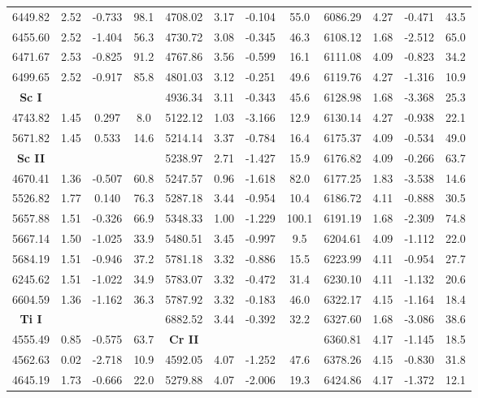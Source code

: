 \documentclass[dvips,12pt,a4paper]{report}
\begin{document}
{{\begin{table}[h]
\begin{tabular}{c c c c | c c c c | c c c c}
6449.82 & 2.52 & -0.733 &  98.1 & 4708.02 & 3.17 & -0.104 &  55.0 & 6086.29 & 4.27 & -0.471 &  43.5 \\
6455.60 & 2.52 & -1.404 &  56.3 & 4730.72 & 3.08 & -0.345 &  46.3 & 6108.12 & 1.68 & -2.512 &  65.0 \\
6471.67 & 2.53 & -0.825 &  91.2 & 4767.86 & 3.56 & -0.599 &  16.1 & 6111.08 & 4.09 & -0.823 &  34.2 \\
6499.65 & 2.52 & -0.917 &  85.8 & 4801.03 & 3.12 & -0.251 &  49.6 & 6119.76 & 4.27 & -1.316 &  10.9 \\
\textbf{Sc I} &  & &  & 4936.34 & 3.11 & -0.343 &  45.6 & 6128.98 & 1.68 & -3.368 &  25.3 \\
4743.82 & 1.45 &  0.297 &   8.0 & 5122.12 & 1.03 & -3.166 &  12.9 & 6130.14 & 4.27 & -0.938 &  22.1 \\
5671.82 & 1.45 &  0.533 &  14.6 & 5214.14 & 3.37 & -0.784 &  16.4 & 6175.37 & 4.09 & -0.534 &  49.0 \\
\textbf{Sc II} &  & & & 5238.97 & 2.71 & -1.427 &  15.9 & 6176.82 & 4.09 & -0.266 &  63.7 \\
4670.41 & 1.36 & -0.507 &  60.8 & 5247.57 & 0.96 & -1.618 &  82.0 & 6177.25 & 1.83 & -3.538 &  14.6 \\
5526.82 & 1.77 &  0.140 &  76.3 & 5287.18 & 3.44 & -0.954 &  10.4 & 6186.72 & 4.11 & -0.888 &  30.5 \\
5657.88 & 1.51 & -0.326 &  66.9 & 5348.33 & 1.00 & -1.229 & 100.1 & 6191.19 & 1.68 & -2.309 &  74.8 \\
5667.14 & 1.50 & -1.025 &  33.9 & 5480.51 & 3.45 & -0.997 &   9.5 & 6204.61 & 4.09 & -1.112 &  22.0 \\
5684.19 & 1.51 & -0.946 &  37.2 & 5781.18 & 3.32 & -0.886 &  15.5 & 6223.99 & 4.11 & -0.954 &  27.7 \\
6245.62 & 1.51 & -1.022 &  34.9 & 5783.07 & 3.32 & -0.472 &  31.4 & 6230.10 & 4.11 & -1.132 &  20.6 \\
6604.59 & 1.36 & -1.162 &  36.3 & 5787.92 & 3.32 & -0.183 &  46.0 & 6322.17 & 4.15 & -1.164 &  18.4 \\
\textbf{Ti I} &  & & & 6882.52 & 3.44 & -0.392 &  32.2 & 6327.60 & 1.68 & -3.086 &  38.6 \\
4555.49 & 0.85 & -0.575 &  63.7 & \textbf{Cr II} & & &  & 6360.81 & 4.17 & -1.145 &  18.5 \\
4562.63 & 0.02 & -2.718 &  10.9 & 4592.05 & 4.07 & -1.252 &  47.6 & 6378.26 & 4.15 & -0.830 &  31.8 \\
4645.19 & 1.73 & -0.666 &  22.0 & 5279.88 & 4.07 & -2.006 &  19.3 & 6424.86 & 4.17 & -1.372 &  12.1 \\

\end{tabular}
\end{table}}}
\end{document}
